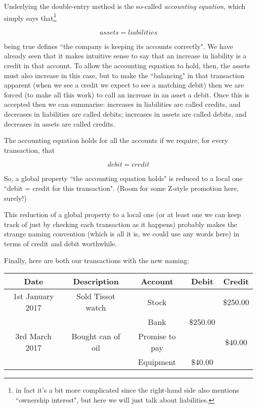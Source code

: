 \documentclass[11pt]{amsart}
\begin{document}
Underlying the double-entry method is the so-called \emph{accounting equation}, which simply says that\footnote{in fact it's a bit more complicated since the right-hand side also mentions ``ownership interest", but here we will just talk about liabilities.} 

\[
assets = liabilities
\]

\noindent being true defines ``the company is keeping its accounts correctly". We have already seen that it makes intuitive sense to say that an increase in liability is a credit in that account. To allow the accounting equation to hold, then, the assets must also increase in this case, but to make the ``balancing" in that transaction apparent (when we see a credit we expect to see a matching debit) then we are forced (to make all this work) to call an increase in an asset a debit. Once this is accepted then we can summarise: increases in liabilities are called credits, and decreases in liabilities are called debits; increases in assets are called debits, and decreases in assets are called credits.

The accounting equation holds for all the accounts if we require, for every transaction, that

\[
debit = credit
\]

So, a global property ``the accounting equation holds" is reduced to a local one ``debit = credit for this transaction". (Room for some Z-style promotion here, surely!) 

This reduction of a global property to a local one (or at least one we can keep track of just by checking each transaction as it happens) probably makes the strange naming convention (which is all it is, we could use any words here) in terms of credit and debit worthwhile.

Finally, here are both our transactions with the new naming:

\begin{table}[h]
\begin{center}
\begin{tabular}{|c|c|c|c|c|}
Date & Description & Account & Debit & Credit\\
\hline \hline
1st January 2017 & Sold Tissot watch & Stock &   &\$250.00 \\
\hline
& &  Bank & \$250.00 &  \\
\hline \hline
3rd March 2017 &  Bought can of oil & Promise to pay & & \$40.00  \\
\hline
&  &  Equipment & \$40.00 & 
\end{tabular}
\end{center}
\label{default}
\end{table}%
\end{document}
